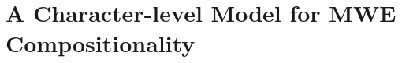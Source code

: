 \documentclass[11pt]{article}
\begin{document}


\section{A Character-level Model for MWE Compositionality}
\end{document}
